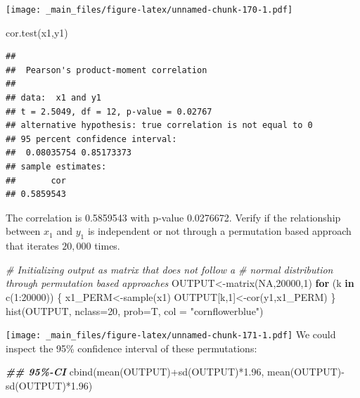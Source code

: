 \documentclass[
  notitlepage,
  onecolumn,
  openany]{book}
\newenvironment{Shaded}{\begin{snugshade}}{\end{snugshade}}
\newcommand{\AttributeTok}[1]{\textcolor[rgb]{0.77,0.63,0.00}{#1}}
\newcommand{\CommentTok}[1]{\textcolor[rgb]{0.56,0.35,0.01}{\textit{#1}}}
\newcommand{\ConstantTok}[1]{\textcolor[rgb]{0.00,0.00,0.00}{#1}}
\newcommand{\ControlFlowTok}[1]{\textcolor[rgb]{0.13,0.29,0.53}{\textbf{#1}}}
\newcommand{\DecValTok}[1]{\textcolor[rgb]{0.00,0.00,0.81}{#1}}
\newcommand{\DocumentationTok}[1]{\textcolor[rgb]{0.56,0.35,0.01}{\textbf{\textit{#1}}}}
\newcommand{\FloatTok}[1]{\textcolor[rgb]{0.00,0.00,0.81}{#1}}
\newcommand{\FunctionTok}[1]{\textcolor[rgb]{0.00,0.00,0.00}{#1}}
\newcommand{\NormalTok}[1]{#1}
\newcommand{\OtherTok}[1]{\textcolor[rgb]{0.56,0.35,0.01}{#1}}
\newcommand{\SpecialCharTok}[1]{\textcolor[rgb]{0.00,0.00,0.00}{#1}}
\newcommand{\StringTok}[1]{\textcolor[rgb]{0.31,0.60,0.02}{#1}}
\begin{document}
\texttt{[image: \_main\_files/figure-latex/unnamed-chunk-170-1.pdf]}

\begin{Shaded}
\begin{Highlighting}[]
\FunctionTok{cor.test}\NormalTok{(x1,y1)}
\end{Highlighting}
\end{Shaded}

\begin{verbatim}
## 
##  Pearson's product-moment correlation
## 
## data:  x1 and y1
## t = 2.5049, df = 12, p-value = 0.02767
## alternative hypothesis: true correlation is not equal to 0
## 95 percent confidence interval:
##  0.08035754 0.85173373
## sample estimates:
##       cor 
## 0.5859543
\end{verbatim}

The correlation is 0.5859543 with p-value 0.0276672. Verify if the relationship between \(x_1\) and \(y_1\) is independent or not through a permutation based approach that iterates \(20,000\) times.

\begin{Shaded}
\begin{Highlighting}[]
\CommentTok{\# Initializing output as matrix that does not follow a }
\CommentTok{\# normal distribution through permutation based approaches}
\NormalTok{OUTPUT}\OtherTok{\textless{}{-}}\FunctionTok{matrix}\NormalTok{(}\ConstantTok{NA}\NormalTok{,}\DecValTok{20000}\NormalTok{,}\DecValTok{1}\NormalTok{)}
\ControlFlowTok{for}\NormalTok{ (k }\ControlFlowTok{in} \FunctionTok{c}\NormalTok{(}\DecValTok{1}\SpecialCharTok{:}\DecValTok{20000}\NormalTok{))}
\NormalTok{\{}
\NormalTok{  x1\_PERM}\OtherTok{\textless{}{-}}\FunctionTok{sample}\NormalTok{(x1)}
\NormalTok{  OUTPUT[k,}\DecValTok{1}\NormalTok{]}\OtherTok{\textless{}{-}}\FunctionTok{cor}\NormalTok{(y1,x1\_PERM)}
\NormalTok{\}}
\FunctionTok{hist}\NormalTok{(OUTPUT, }\AttributeTok{nclass=}\DecValTok{20}\NormalTok{, }\AttributeTok{prob=}\NormalTok{T, }\AttributeTok{col =} \StringTok{"cornflowerblue"}\NormalTok{)}
\end{Highlighting}
\end{Shaded}

\texttt{[image: \_main\_files/figure-latex/unnamed-chunk-171-1.pdf]}
We could inspect the 95\% confidence interval of these permutations:

\begin{Shaded}
\begin{Highlighting}[]
\DocumentationTok{\#\# 95\%{-}CI}
\FunctionTok{cbind}\NormalTok{(}\FunctionTok{mean}\NormalTok{(OUTPUT)}\SpecialCharTok{+}\FunctionTok{sd}\NormalTok{(OUTPUT)}\SpecialCharTok{*}\FloatTok{1.96}\NormalTok{, }\FunctionTok{mean}\NormalTok{(OUTPUT)}\SpecialCharTok{{-}}\FunctionTok{sd}\NormalTok{(OUTPUT)}\SpecialCharTok{*}\FloatTok{1.96}\NormalTok{)}
\end{Highlighting}
\end{Shaded}
\end{document}
